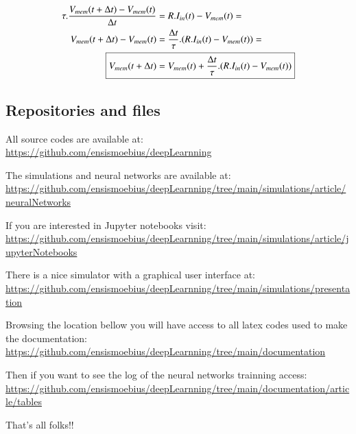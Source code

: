 		\begin{equation}
			\label{eq:membraneDerivative}
			\begin{aligned}
				\tau.\dfrac{V_{mem}(t+\Delta t) - V_{mem}(t)}{\Delta t} &= R.I_{in}(t) - V_{mem}(t) = \\
				V_{mem}(t+\Delta t) - V_{mem}(t) &= \frac{\Delta t}{\tau} . (R.I_{in}(t) - V_{mem}(t)) = \\
				\Aboxed{V_{mem}(t+\Delta t) &= V_{mem}(t) + \frac{\Delta t}{\tau} . (R.I_{in}(t) - V_{mem}(t))}
			\end{aligned}
		\end{equation}

	\subsection{Repositories and files}
		\par All source codes are available at: \\ \href{https://github.com/ensismoebius/deepLearnning}{https://github.com/ensismoebius/deepLearnning}
		\par The simulations and neural networks are available at: \\ \href{https://github.com/ensismoebius/deepLearnning/tree/main/simulations/article/neuralNetworks}{https://github.com/ensismoebius/deepLearnning/tree/main/simulations/article/neuralNetworks}
		\par If you are interested in Jupyter notebooks visit: \\
		\href{https://github.com/ensismoebius/deepLearnning/tree/main/simulations/article/jupyterNotebooks}{https://github.com/ensismoebius/deepLearnning/tree/main/simulations/article/jupyterNotebooks} 
		\par There is a nice simulator with a graphical user interface at: \\
		\href{https://github.com/ensismoebius/deepLearnning/tree/main/simulations/presentation}{https://github.com/ensismoebius/deepLearnning/tree/main/simulations/presentation}
		\par Browsing the location bellow you will have access to all latex codes used to make the documentation:\\
		\href{https://github.com/ensismoebius/deepLearnning/tree/main/documentation}{https://github.com/ensismoebius/deepLearnning/tree/main/documentation}
		\par Then if you want to see the log of the neural networks trainning access:\\
		\href{https://github.com/ensismoebius/deepLearnning/tree/main/documentation/article/tables}{https://github.com/ensismoebius/deepLearnning/tree/main/documentation/article/tables} \newline
		
		\par That's all folks!!
	